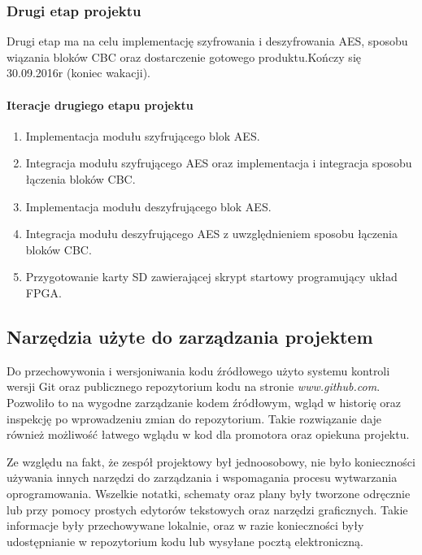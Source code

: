 \subsubsection{Drugi etap projektu}
Drugi etap ma na celu implementację szyfrowania i deszyfrowania AES, sposobu wiązania bloków CBC oraz dostarczenie gotowego produktu.Kończy się 30.09.2016r (koniec wakacji).
\paragraph{Iteracje drugiego etapu projektu}
\begin{enumerate}
\item Implementacja modułu szyfrującego blok AES.
\item Integracja modułu szyfrującego AES oraz implementacja i integracja sposobu łączenia bloków CBC.
\item Implementacja modułu deszyfrującego blok AES.
\item Integracja modułu deszyfrującego AES z uwzględnieniem sposobu łączenia bloków CBC.
\item Przygotowanie karty SD zawierającej skrypt startowy programujący układ FPGA.
\end{enumerate}

\subsection{Narzędzia użyte do zarządzania projektem}
Do przechowywonia i wersjoniwania kodu źródłowego użyto systemu kontroli wersji Git oraz publicznego repozytorium kodu na stronie \textit{www.github.com}. Pozwoliło to na wygodne zarządzanie kodem źródłowym, wgląd w historię oraz inspekcję po wprowadzeniu zmian do repozytorium. Takie rozwiązanie daje również możliwość łatwego wglądu w kod dla promotora oraz opiekuna projektu.

Ze względu na fakt, że zespół projektowy był jednoosobowy, nie było konieczności używania innych narzędzi do zarządzania i wspomagania procesu wytwarzania oprogramowania. Wszelkie notatki, schematy oraz plany były tworzone odręcznie lub przy pomocy prostych edytorów tekstowych oraz narzędzi graficznych. Takie informacje były przechowywane lokalnie, oraz w razie konieczności były udostępnianie w repozytorium kodu lub wysyłane pocztą elektroniczną.